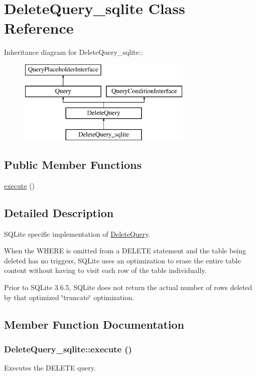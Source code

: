 \hypertarget{classDeleteQuery__sqlite}{
\section{DeleteQuery\_\-sqlite Class Reference}
\label{classDeleteQuery__sqlite}
}
Inheritance diagram for DeleteQuery\_\-sqlite::\begin{figure}[H]
\begin{center}
\leavevmode
\includegraphics[height=4cm]{classDeleteQuery__sqlite}
\end{center}
\end{figure}
\subsection*{Public Member Functions}
\begin{DoxyCompactItemize}
\item 
\hyperlink{classDeleteQuery__sqlite_adfbc9a2783273c02c450bb0d7ff853a8}{execute} ()
\end{DoxyCompactItemize}


\subsection{Detailed Description}
SQLite specific implementation of \hyperlink{classDeleteQuery}{DeleteQuery}.

When the WHERE is omitted from a DELETE statement and the table being deleted has no triggers, SQLite uses an optimization to erase the entire table content without having to visit each row of the table individually.

Prior to SQLite 3.6.5, SQLite does not return the actual number of rows deleted by that optimized \char`\"{}truncate\char`\"{} optimization. 

\subsection{Member Function Documentation}
\hypertarget{classDeleteQuery__sqlite_adfbc9a2783273c02c450bb0d7ff853a8}{
\subsubsection[{execute}]{\setlength{\rightskip}{0pt plus 5cm}DeleteQuery\_\-sqlite::execute ()}}
\label{classDeleteQuery__sqlite_adfbc9a2783273c02c450bb0d7ff853a8}
Executes the DELETE query.


